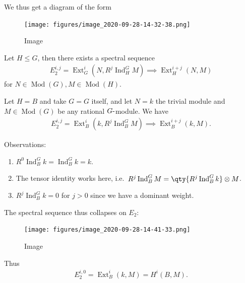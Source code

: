 We thus get a diagram of the form

\begin{figure}
\centering
\texttt{[image: figures/image\_2020-09-28-14-32-38.png]}
\caption{Image}
\end{figure}

\begin{proposition}[?]

Let \(H\leq G\), then there exists a spectral sequence
\begin{align*}  
E^{i, j}_2 = \operatorname{Ext}_G^i(N, R^j \operatorname{Ind}_H^G M) \implies \operatorname{Ext}_H^{i+j}(N, M)
\end{align*}
for \(N\in {\operatorname{Mod}}(G), M\in {\operatorname{Mod}}(H)\).

\end{proposition}

\begin{example}

Let \(H=B\) and take \(G=G\) itself, and let \(N = k\) the trivial
module and \(M\in {\operatorname{Mod}}(G)\) be any rational
\(G{\hbox{-}}\)module. We have
\begin{align*}  
E_2^{i, j} = \operatorname{Ext}^{i}_B(k, R^j \operatorname{Ind}_B^G M) \implies \operatorname{Ext}^{i+j}_B(k, M)
.\end{align*}

Observations:

\begin{enumerate}
\def\labelenumi{\arabic{enumi}.}
\setcounter{enumi}{-1}
\item
  \(R^0 \operatorname{Ind}_B^G k = \operatorname{Ind}_B^G k = k\).
\item
  The tensor identity works here,
  i.e.~\(R^j \operatorname{Ind}_B^G M = \qty{R^j \operatorname{Ind}_B^G k} \otimes M\).
\item
  \(R^j \operatorname{Ind}_B^G k = 0\) for \(j> 0\) since we have a
  dominant weight.
\end{enumerate}

The spectral sequence thus collapses on \(E_2\):

\begin{figure}
\centering
\texttt{[image: figures/image\_2020-09-28-14-41-33.png]}
\caption{Image}
\end{figure}

Thus
\begin{align*}  
E_2^{i, 0} = \operatorname{Ext}^i_B(k, M) = H^i(B, M)
.\end{align*}

\end{example}

